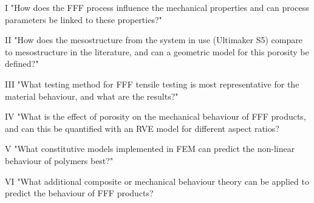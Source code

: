 I "How does the FFF process influence the mechanical properties and can process parameters be linked to these properties?"

II "How does the mesostructure from the system in use (Ultimaker S5) compare to mesostructure in the literature, and can a geometric model for this porosity be defined?"

III "What testing method for FFF tensile testing is most representative for the material behaviour, and what are the results?"

IV "What is the effect of porosity on the mechanical behaviour of FFF products, and can this be quantified with an RVE model for different aspect ratios?

V "What constitutive models implemented in FEM can predict the non-linear behaviour of polymers best?"

VI "What additional composite or mechanical behaviour theory can be applied to predict the behaviour of FFF products?










